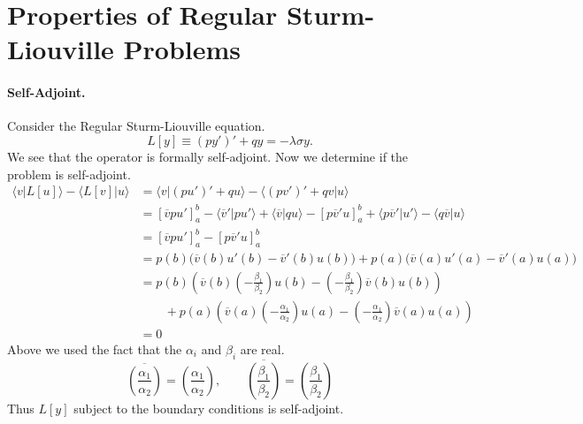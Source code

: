 \section{Properties of Regular Sturm-Liouville Problems}

\paragraph{Self-Adjoint.}
Consider the Regular Sturm-Liouville equation.
\[ 
L[y] \equiv (p y')' + q y = - \lambda \sigma y.
\]
We see that the operator is formally self-adjoint.  Now we determine if the 
problem is self-adjoint.
\begin{align*}
  \langle v | L[u] \rangle - \langle L[v] | u \rangle 
  &= \langle v | (p u')' + q u \rangle - \langle (p v')' + q v | u \rangle 
  \\
  &= [ \overline{v} p u']_a^b - \langle \overline{v}' | p u' \rangle + \langle \overline{v} | q u \rangle
  - [p \overline{v}' u]_a^b + \langle p \overline{v}' | u' \rangle - \langle q \overline{v} | u \rangle 
  \\
  &= [ \overline{v} p u']_a^b - [p \overline{v}' u]_a^b 
  \\
  &= p(b) \big( \overline{v}(b) u'(b) - \overline{v}'(b) u(b) \big)
  + p(a) \big( \overline{v}(a) u'(a) - \overline{v}'(a) u(a) \big) 
  \\
  &= p(b) \left( \overline{v}(b) \left(-\frac{\beta_1}{\beta_2}\right) u(b) 
    - \left(-\frac{\beta_1}{\beta_2}\right)\overline{v}(b) u(b) \right)
  \\
  &\qquad + p(a) \left( \overline{v}(a) 
    \left(-\frac{\alpha_1}{\alpha_2}\right) u(a) 
    - \left(-\frac{\alpha_1}{\alpha_2}\right)
    \overline{v}(a) u(a) \right) 
  \\
  &= 0    
\end{align*}
Above we used the fact that the $\alpha_i$ and $\beta_i$ are real.
\[
\overline{ \left( \frac{\alpha_1}{\alpha_2} \right) } 
=  \left( \frac{\alpha_1}{\alpha_2} \right) , \qquad
\overline{ \left( \frac{\beta_1}{\beta_2} \right) }
= \left( \frac{\beta_1}{\beta_2} \right)
\]
Thus $L[y]$ subject to the boundary conditions is self-adjoint.







